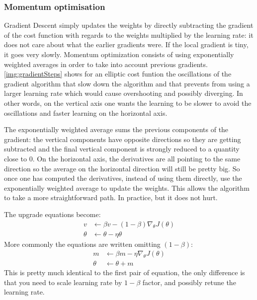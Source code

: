 \subsubsection{Momentum optimisation}
\label{subsubsec:momentum}
Gradient Descent simply updates the weights by directly subtracting the gradient of the cost function  with regards to the weights multiplied by the learning rate: it does not care about what the earlier gradients were. If the local gradient is tiny, it goes very slowly. Momentum optimization consists of using exponentially weighted averages in order to take into account previous gradients. \autoref{img:gradientSteps} shows for an elliptic cost funtion the oscillations of the gradient algorithm that slow down the algorithm and that prevents from using a larger learning rate which would cause overshooting and possibly diverging. In other words, on the vertical axis one wants the learning to be slower to avoid the oscillations and faster learning on the horizontal axis.

The exponentially weighted average sums the previous components of the gradient: the vertical components have opposite directions so they are getting subtracted and the final vertical component is strongly reduced to a quantity close to $0$. On the horizontal axis, the derivatives are all pointing to the same direction so the average on the horizontal direction will still be pretty big. So once one has computed the derivatives, instead of using them directly, use the exponentially weighted average to update the weights. This allows the algorithm to take a more straightforward path. In practice,  but it does not hurt.

The upgrade equations become:
\begin{equation}
\begin{aligned}
v &\leftarrow \beta v - (1-\beta) \nabla_\theta J(\theta)\\
\theta &\leftarrow \theta - \eta \theta
\end{aligned}
\end{equation}
More commonly the equations are written omitting $(1-\beta)$:
\begin{equation}
\begin{aligned}
m &\leftarrow \beta m - \eta \nabla_\theta J(\theta)\\
\theta &\leftarrow \theta + m
\end{aligned}
\end{equation}
This is pretty much identical to the first pair of equation, the only difference is that you need to scale learning rate by $1-\beta$ factor, and possibly retune the learning rate.

